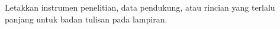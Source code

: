Letakkan instrumen penelitian, data pendukung, atau rincian yang terlalu panjang
untuk badan tulisan pada lampiran.
